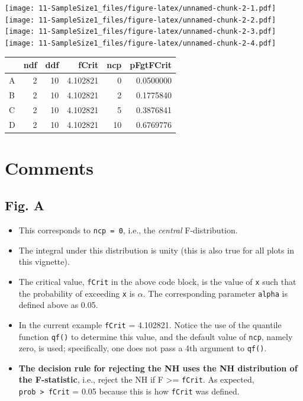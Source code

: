 \documentclass[]{book}
\providecommand{\tightlist}{%
  \setlength{\itemsep}{0pt}\setlength{\parskip}{0pt}}
\begin{document}
\texttt{[image: 11-SampleSize1\_files/figure-latex/unnamed-chunk-2-1.pdf]} \texttt{[image: 11-SampleSize1\_files/figure-latex/unnamed-chunk-2-2.pdf]} \texttt{[image: 11-SampleSize1\_files/figure-latex/unnamed-chunk-2-3.pdf]} \texttt{[image: 11-SampleSize1\_files/figure-latex/unnamed-chunk-2-4.pdf]}

\begin{tabular}{l|r|r|r|r|r}
\hline
  & ndf & ddf & fCrit & ncp & pFgtFCrit\\
\hline
A & 2 & 10 & 4.102821 & 0 & 0.0500000\\
\hline
B & 2 & 10 & 4.102821 & 2 & 0.1775840\\
\hline
C & 2 & 10 & 4.102821 & 5 & 0.3876841\\
\hline
D & 2 & 10 & 4.102821 & 10 & 0.6769776\\
\hline
\end{tabular}

\hypertarget{comments}{%
\section{Comments}\label{comments}}

\hypertarget{fig.-a}{%
\subsection{Fig. A}\label{fig.-a}}

\begin{itemize}
\tightlist
\item
  This corresponds to \texttt{ncp\ =\ 0}, i.e., the \emph{central} F-distribution.
\item
  The integral under this distribution is unity (this is also true for all plots in this vignette).
\item
  The critical value, \texttt{fCrit} in the above code block, is the value of \texttt{x} such that the probability of exceeding \texttt{x} is \(\alpha\). The corresponding parameter \texttt{alpha} is defined above as 0.05.
\item
  In the current example \texttt{fCrit} = 4.102821. Notice the use of the quantile function \texttt{qf()} to determine this value, and the default value of \texttt{ncp}, namely zero, is used; specifically, one does not pass a 4th argument to \texttt{qf()}.
\item
  \textbf{The decision rule for rejecting the NH uses the NH distribution of the F-statistic}, i.e., reject the NH if F \textgreater{}= \texttt{fCrit}. As expected, \texttt{prob\ \textgreater{}\ fCrit} = 0.05 because this is how \texttt{fCrit} was defined.
\end{itemize}
\end{document}
